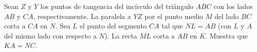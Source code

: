 Sean $Z$ y $Y$ los puntos de tangencia del incírculo del triángulo $ABC$ con los lados $AB$ y $CA$, respectivamente. La paralela a $YZ$ por el punto medio $M$ del lado $BC$ corta a $CA$ en $N$. Sea $L$ el punto del segmento $CA$ tal que $NL=AB$ (con $L$ y $A$ del mismo lado con respecto a $N$). La recta $ML$ corta a $AB$ en $K$. Muestra que $KA=NC$.